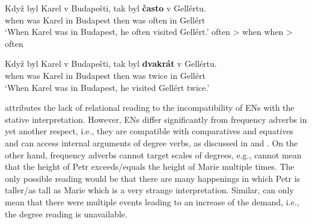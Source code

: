 \documentclass[output=paper,modfonts,hidelinks,newtxmath
\ChapterDOI{10.5281/zenodo.2545513}
]{langscibook}
\begin{document}
\ea\label{casto-(non)relational-reading} \gll Když byl Karel v Budapešti, tak byl \textbf{často} v Gellértu.\\
when was Karel in Budapest then was often in Gellért\\
\glt `When Karel was in Budapest, he often visited Gellért.'
\ea often \textgreater{} when\label{casto-relational-reading}
\ex when \textgreater{} often\label{casto-non-relational-reading}
\z \z

\ea\label{dvakrat-(non)relational-reading} \gll Když byl Karel v Budapešti, tak byl \textbf{dvakrát} v Gellértu.\\
when was Karel in Budapest then was twice in Gellért\\
\glt `When Karel was in Budapest, he visited Gellért twice.'
\z \z

\noindent \cite{doetjes_adverbs_2007} attributes the lack of relational reading to the incompatibility of ENs with the stative interpretation. However, ENs differ significantly from frequency adverbs in yet another respect, i.e., they are compatible with comparatives and equatives and can access internal arguments of degree verbs, as discussed in  and . On the other hand, frequency adverbs cannot target scales of degrees, e.g.,  cannot mean that the height of Petr exceeds/equals the height of Marie multiple times. The only possible reading would be that there are many happenings in which Petr is taller/as tall as Marie which is a very strange interpretation. Similar,  can only mean that there were multiple events leading to an increase of the demand, i.e., the degree reading is unavailable.

\z

\z

\begin{table}[b]
\caption{Scopal properties of adverbs of quantification}\label{table:scale}
{}
\end{table}
\end{document}
